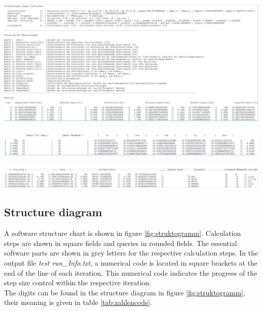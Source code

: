 \documentclass[oneside]{article}
\numberwithin{equation}{section}
\numberwithin{figure}{section}
\numberwithin{figure}{section}
\begin{document}
%
\begin{landscape}
    \includegraphics[scale=0.5]{testlauf_info161.png}\\
    $ $\\ 
    \includegraphics[scale=0.5]{testlauf_info162.png}\\
    $ $\\ 
    \includegraphics[scale=0.5]{testlauf_info163.png}
\end{landscape}

\subsection{Structure diagram}
A software structure chart is shown in figure \ref{fig:struktogramm}.
Calculation steps are shown in square fields and queries in rounded fields.
The essential software parts are shown in grey letters for the respective calculation steps.
In the output file \emph{test run\_Info.txt}, a numerical code is located in square brackets at the end of the line of each iteration.
This numerical code indicates the progress of the step size control within the respective iteration.\\
The digits can be found in the structure diagram in figure \ref{fig:struktogramm}, their meaning is given in table \ref{tab:zahlencode}.
\end{document}
